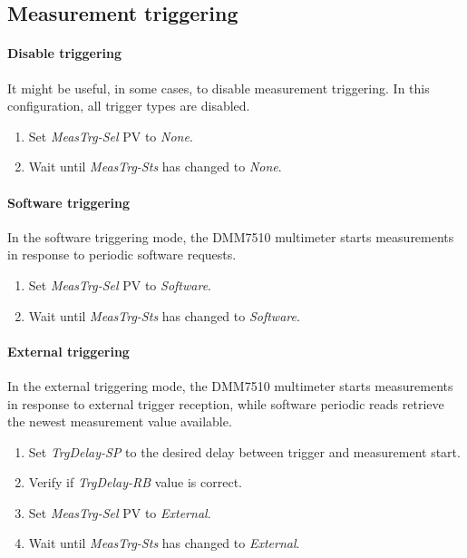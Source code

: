 \documentclass[openany]{article}
\begin{document}
	\subsection{Measurement triggering}

		\paragraph{Disable triggering}\label{disable-triggering} It might be useful, in some cases, to disable measurement triggering. In this configuration, all trigger types are disabled.

			\begin{enumerate}
				\item Set \emph{MeasTrg-Sel} PV to \emph{None}.
				\item Wait until \emph{MeasTrg-Sts} has changed to \emph{None}.
			\end{enumerate}

		\paragraph{Software triggering} In the software triggering mode, the DMM7510 multimeter starts measurements in response to periodic software requests.

			\begin{enumerate}
				\item Set \emph{MeasTrg-Sel} PV to \emph{Software}.
				\item Wait until \emph{MeasTrg-Sts} has changed to \emph{Software}.
			\end{enumerate}

		\paragraph{External triggering} In the external triggering mode, the DMM7510 multimeter starts measurements in response to external trigger reception, while software periodic reads retrieve the newest measurement value available.

			\begin{enumerate}
				\item Set \emph{TrgDelay-SP} to the desired delay between trigger and measurement start.
				\item Verify if \emph{TrgDelay-RB} value is correct.
				\item Set \emph{MeasTrg-Sel} PV to \emph{External}.
				\item Wait until \emph{MeasTrg-Sts} has changed to \emph{External}.
			\end{enumerate}
\end{document}
